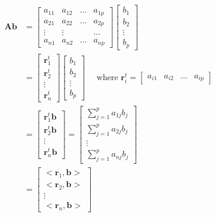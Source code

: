 \documentclass[
  11pt,
  a4paper,
  oneside]{scrbook}
\theoremstyle{definition}
\theoremstyle{plain}
\theoremstyle{definition}
\theoremstyle{definition}
\theoremstyle{remark}
\begin{document}
\[
\begin{align}
{\pmb A} {\pmb b} & = 
\begin{bmatrix}
a_{11} & a_{12} & \dots & a_{1p} \\
a_{21} & a_{22} & \dots & a_{2p} \\
\vdots & \vdots &    & \dots \\
a_{n1} & a_{n2} & \dots & a_{np} 
\end{bmatrix}
\begin{bmatrix}
b_1 \\
b_2 \\
\vdots \\
b_p 
\end{bmatrix} \\
& = 
\begin{bmatrix}
{\pmb r}^t_1 \\
{\pmb r}^t_2 \\
\vdots \\
{\pmb r}^t_n 
\end{bmatrix} 
\begin{bmatrix}
b_1 \\
b_2 \\
\vdots \\
b_p 
\end{bmatrix} 
\quad 
\text{ where }
{\pmb r}^t_i =
\begin{bmatrix}
a_{i1} & a_{i2} & \dots & a_{ip} 
\end{bmatrix}  \\
& = 
\begin{bmatrix}
{\pmb r}^t_1 {\pmb b} \\
{\pmb r}^t_2 {\pmb b} \\
\vdots \\
{\pmb r}^t_n {\pmb b}
\end{bmatrix}  
 = 
\begin{bmatrix}
\sum_{j=1}^p a_{1j} b_j \\
\sum_{j=1}^p a_{2j} b_j \\
\vdots \\
\sum_{j=1}^p a_{nj} b_j
\end{bmatrix} \\
& = 
\begin{bmatrix}
 <\pmb r_1, \pmb b>  \\
 <\pmb r_2, \pmb b> \\
\vdots \\
 <\pmb r_n, \pmb b>
\end{bmatrix}
\end{align}
\]
\end{document}
